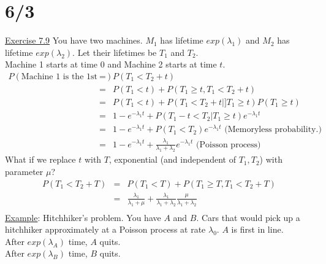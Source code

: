 \section*{6/3}
  \underline{Exercise 7.9}
    You have two machines. $M_1$ has lifetime $exp(\lambda_1)$ and $M_2$
    has lifetime $exp(\lambda_2)$. Let their lifetimes be $T_1$ and $T_2$.\\
    Machine 1 starts at time 0 and Machine 2 starts at time $t$.
    \begin{eqnarray*}
      P(\text{Machine 1 is the 1st to fail}) 
      & = & P(T_1 < T_2 + t)\\
      & = & P(T_1 < t)  + P(T_1 \ge t, T_1 < T_2 + t)\\
      & = & P(T_1 < t) + P(T_1 < T_2 + t |] T_1 \ge t) P(T_1 \ge t)\\
      & = & 1 - e^{-\lambda_1 t} + P(T_1 - t < T_2 | T_1 \ge t) e^{-\lambda_1 t}\\
      & = & 1 - e^{-\lambda_1 t} + P(T_1 < T_2) e^{-\lambda_1 t} \text{ (Memoryless probability.)}\\
      & = & 1 - e^{-\lambda_1 t} + \frac{\lambda_1}{\lambda_1 + \lambda_2} 
        e^{-\lambda_1 t} \text{ (Poisson process)}
    \end{eqnarray*}
    What if we replace $t$ with $T$, exponential (and independent of $T_1, T_2$)
    with parameter $\mu$?\\
    \begin{eqnarray*} 
      P(T_1 < T_2 + T)
      & = & P(T_1 < T) + P(T_1 \ge T, T_1 < T_2 + T)\\
      & = & \frac{\lambda_1}{\lambda_1 + \mu} + \frac{\lambda_1}{\lambda_1 + 
        \lambda_2}\frac{\mu}{\lambda_1 + \lambda_2}\\
    \end{eqnarray*}
  \underline{Example}: Hitchhiker's problem. You have $A$ and $B$. Cars that
  would pick up a hitchhiker approximately at a Poisson process at rate 
  $\lambda_0$. $A$ is first in line.\\
  After $exp(\lambda_A)$ time, $A$ quits.\\
  After $exp(\lambda_B)$ time, $B$ quits.\\
